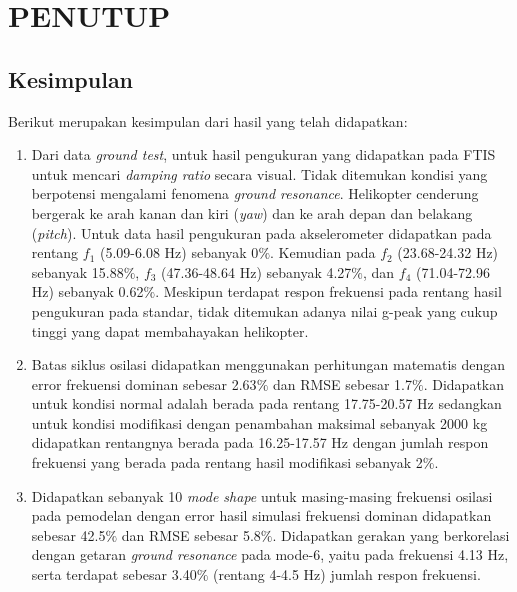 \chapter{PENUTUP}
\label{chap:penutup}


\section{Kesimpulan}
\label{sec:kesimpulan}

Berikut merupakan kesimpulan dari hasil yang telah didapatkan:

\begin{enumerate}[nolistsep]

	\item Dari data \textit{ground test}, untuk hasil pengukuran yang didapatkan pada FTIS untuk mencari \textit{damping ratio} secara visual. Tidak ditemukan kondisi yang berpotensi mengalami fenomena \textit{ground resonance}. Helikopter cenderung bergerak ke arah kanan dan kiri (\textit{yaw}) dan ke arah depan dan belakang (\textit{pitch}). Untuk data hasil pengukuran pada akselerometer didapatkan pada rentang $f_1$ (5.09-6.08 Hz) sebanyak 0$\%$. Kemudian pada $f_2$ (23.68-24.32 Hz) sebanyak 15.88$\%$, $f_3$ (47.36-48.64 Hz) sebanyak 4.27$\%$, dan $f_4$ (71.04-72.96 Hz) sebanyak 0.62$\%$. Meskipun terdapat respon frekuensi pada rentang hasil pengukuran pada standar, tidak ditemukan adanya nilai g-peak yang cukup tinggi yang dapat membahayakan helikopter.

	\item Batas siklus osilasi didapatkan menggunakan perhitungan matematis dengan error frekuensi dominan sebesar 2.63$\%$ dan RMSE sebesar 1.7$\%$. Didapatkan untuk kondisi normal adalah berada pada rentang 17.75-20.57 Hz sedangkan untuk kondisi modifikasi dengan penambahan maksimal sebanyak 2000 kg didapatkan rentangnya berada pada 16.25-17.57 Hz dengan jumlah respon frekuensi yang berada pada rentang hasil modifikasi sebanyak 2$\%$.
     
	\item Didapatkan sebanyak 10 \textit{mode shape} untuk masing-masing frekuensi osilasi pada pemodelan dengan error hasil simulasi frekuensi dominan didapatkan sebesar 42.5$\%$ dan RMSE sebesar 5.8$\%$. Didapatkan gerakan yang berkorelasi dengan getaran \textit{ground resonance} pada mode-6, yaitu pada frekuensi 4.13 Hz, serta terdapat sebesar 3.40$\%$ (rentang 4-4.5 Hz) jumlah respon frekuensi.
  
\end{enumerate}

